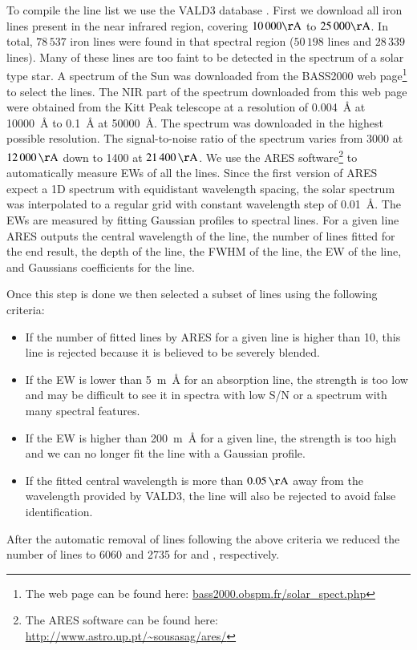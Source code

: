 \documentclass{aa}
\begin{document}
To compile the line list we use the VALD3
database \citep{VALD1,VALD2}. First we
download all iron lines present in the near infrared region, covering
$10\,000\si{\AA}$ to $25\,000\si{\AA}$. In total, $78\,537$ iron lines
were found in that spectral region ($50\,198$  lines and
$28\,339$  lines). Many of these lines are too faint to be
detected in the spectrum of a solar type star. A spectrum of the Sun
was downloaded from the BASS2000 web page\footnote{The web page can
be found here: \url{bass2000.obspm.fr/solar_spect.php}} to select the
lines. The NIR part of the spectrum downloaded from this web page were
obtained from the Kitt Peak telescope \citep{Hinkle1995} at a resolution
of \SI{0.004}{\angstrom} at \SI{10000}{\angstrom} to \SI{0.1}{\angstrom}
at \SI{50000}{\angstrom}. The spectrum was downloaded in the highest
possible resolution. The signal-to-noise ratio of the spectrum varies
from 3000 at $\SI{12000}{\AA}$ down to 1400 at $\SI{21400}{\AA}$. We
use the ARES software\footnote{The ARES software can be found here:
\url{http://www.astro.up.pt/~sousasag/ares/}}\citep{Sousa2007,Sousa2015a
} to automatically measure EWs of all the lines. Since the first version
of ARES expect a 1D spectrum with equidistant wavelength spacing,
the solar spectrum was interpolated to a
regular grid with constant wavelength step of \SI{0.01}{\angstrom}. The
EWs are measured by fitting Gaussian profiles to spectral lines. For a
given line ARES outputs the central wavelength of the line, the number
of lines fitted for the end result, the depth of the line, the FWHM of
the line, the EW of the line, and Gaussians coefficients for the line.

Once this step is done we then selected a subset of lines using the
following criteria:
\begin{itemize}
    \item If the number of fitted lines by ARES for a given line is higher than 10,
        this line is rejected because it is believed to be severely blended.
    \item If the EW is lower than \SI{5}{m\angstrom} for an absorption line, the strength
        is too low and may be difficult to see it in spectra with low S/N or a
        spectrum with many spectral features.
    \item If the EW is higher than \SI{200}{m\angstrom} for a given line, the strength
        is too high and we can no longer fit the line with a Gaussian profile.
    \item If the fitted central wavelength is more than $\SI{0.05}{\AA}$ away
        from the wavelength provided by VALD3, the line will also be rejected to
        avoid false identification.
\end{itemize}
After the automatic removal of lines following the above criteria
we reduced the number of lines to 6060 and 2735 for  and
, respectively.
\end{document}
